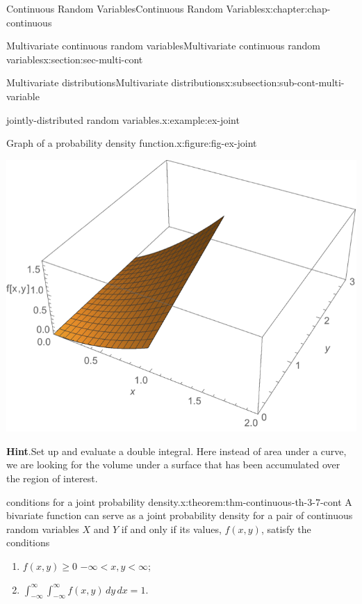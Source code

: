 \documentclass[oneside,10pt,]{book}
\newcommand{\blocktitlefont}{\relax}
\newcommand{\lt}{<}
\begin{document}
\begin{chapterptx}{Continuous Random Variables}{}{Continuous Random Variables}{}{}{x:chapter:chap-continuous}
\begin{sectionptx}{Multivariate continuous random variables}{}{Multivariate continuous random variables}{}{}{x:section:sec-multi-cont}
\begin{subsectionptx}{Multivariate distributions}{}{Multivariate distributions}{}{}{x:subsection:sub-cont-multi-variable}
\begin{example}{jointly-distributed random variables.}{x:example:ex-joint}
\begin{figureptx}{Graph of a probability density function.}{x:figure:fig-ex-joint}{}
\begin{image}{0.25}{0.5}{0.25}
\includegraphics[width=\linewidth]{./images/little_f.png}
\end{image}%
\tcblower
\end{figureptx}%
\textbf{\blocktitlefont Hint}.\quad{}Set up and evaluate a double integral. Here instead of area under a curve, we are looking for the volume under a surface that has been accumulated over the region of interest.%
\end{example}
\begin{theorem}{conditions for a joint probability density.}{}{x:theorem:thm-continuous-th-3-7-cont}%
A bivariate function can serve as a joint probability density for a pair of continuous random variables \(X\) and \(Y\) if and only if its values, \(f(x, y)\), satisfy the conditions%
\begin{enumerate}
\item{}\(f(x, y) \ge 0\)  \(-\infty \lt x, y\lt \infty\);%
\item{}\(\displaystyle\int_{-\infty}^\infty\int_{-\infty}^\infty f(x, y) \,dy\,dx=1\).%
\end{enumerate}
%
\end{theorem}
\end{subsectionptx}
\end{sectionptx}
\end{chapterptx}
\end{document}
